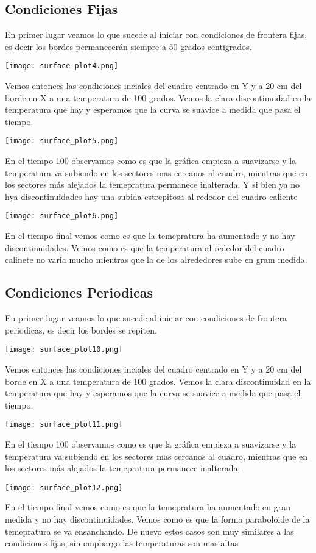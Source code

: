 \documentclass{article}
\begin{document}
\subsection{Condiciones Fijas}
En primer lugar veamos lo que sucede al iniciar con condiciones de frontera fijas, es decir los bordes permanecer\'an siempre a 50 grados centigrados.\\
\centerline{\texttt{[image: surface\_plot4.png]}}
Vemos entonces las condiciones inciales del cuadro centrado en Y y a 20 cm del borde en X a una temperatura de 100 grados. Vemos la clara discontinuidad en la temperatura que hay y esperamos que la curva se suavice a medida que pasa el tiempo.\\
\centerline{\texttt{[image: surface\_plot5.png]}}
En el tiempo 100 observamos como es que la gr\'afica empieza a suavizarse y la temperatura va subiendo en los sectores mas cercanos al cuadro, mientras que en los sectores m\'as alejados la temepratura permanece inalterada. Y si bien ya no hya discontinuidades hay una subida estrepitosa al rededor del cuadro caliente \\
\centerline{\texttt{[image: surface\_plot6.png]}}
En el tiempo final vemos como es que la temepratura ha aumentado y no hay discontinuidades. Vemos como es que la temperatura al rededor del cuadro calinete no varia mucho mientras que la de los alrededores sube en gram medida.\\  
\subsection{Condiciones Periodicas}
En primer lugar veamos lo que sucede al iniciar con condiciones de frontera periodicas, es decir los bordes se repiten.\\
\centerline{\texttt{[image: surface\_plot10.png]}}
Vemos entonces las condiciones inciales del cuadro centrado en Y y a 20 cm del borde en X a una temperatura de 100 grados. Vemos la clara discontinuidad en la temperatura que hay y esperamos que la curva se suavice a medida que pasa el tiempo.\\
\centerline{\texttt{[image: surface\_plot11.png]}}
En el tiempo 100 observamos como es que la gr\'afica empieza a suavizarse y la temperatura va subiendo en los sectores mas cercanos al cuadro, mientras que en los sectores m\'as alejados la temepratura permanece inalterada. \\
\centerline{\texttt{[image: surface\_plot12.png]}}
En el tiempo final vemos como es que la temepratura ha aumentado en gran medida y no hay discontinuidades. Vemos como es que la forma paraboloide de la temepratura se va ensanchando. De nuevo estos casos son muy similares a las condiciones fijas, sin empbargo las temperaturas son mas altas\\  
\end{document}

